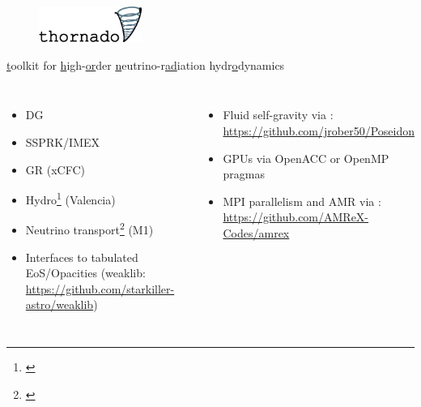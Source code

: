 \documentclass{beamer}
\begin{document}
\begin{frame}

  \begin{figure}[ht]
    \centering
    \includegraphics[width=0.3\textwidth]{fig.thornado_logo.png}
  \end{figure}

  \begin{center}

    \ul{t}oolkit for
    \ul{h}igh-\ul{or}der
    \ul{n}eutrino-r\ul{ad}iation hydr\ul{o}dynamics\\[1em]

  \end{center}

  \begin{columns}[c]


      \begin{itemize}
        \item
          DG
        \item
          SSPRK/IMEX
        \item
          GR (xCFC)
        \item
          Hydro\footnote{\citet{ebd2019,dem2020,pbe2021}}
          (Valencia)
        \item
          Neutrino transport\footnote{\citet{lec2021}} (M1)
        \item
          Interfaces to tabulated EoS/Opacities
          (weaklib: \url{https://github.com/starkiller-astro/weaklib})
      \end{itemize}


      \vspace{-6em}
      \begin{itemize}
        \item
          Fluid self-gravity via \poseidon:
          \url{https://github.com/jrober50/Poseidon}
        \item
          GPUs via OpenACC or OpenMP pragmas
        \item
          MPI parallelism and AMR via \amrex:
          \url{https://github.com/AMReX-Codes/amrex}
      \end{itemize}

  \end{columns}

\end{frame}
\end{document}
